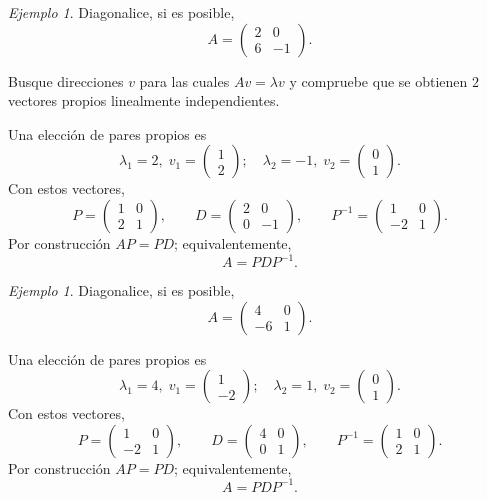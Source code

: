\documentclass[12pt]{article}
\theoremstyle{remark}
\newtheorem{Ejem}[definicion]{Ejemplo}
\begin{document}
\begin{Ejem}

Diagonalice, si es posible,
\[
A=\begin{pmatrix}2 & 0\\6 & -1\end{pmatrix}.
\]


Busque direcciones $v$ para las cuales $Av=\lambda v$ y compruebe que se obtienen $2$ vectores propios linealmente independientes.

\scriptsize
Una elección de pares propios es
\[
\lambda_1=2,\;v_1=\begin{pmatrix}1\\2\end{pmatrix};\quad \lambda_2=-1,\;v_2=\begin{pmatrix}0\\1\end{pmatrix}.
\]
Con estos vectores,
\[
P=\begin{pmatrix}1 & 0\\2 & 1\end{pmatrix},\qquad D=\begin{pmatrix}2 & 0\\0 & -1\end{pmatrix},\qquad P^{-1}=\begin{pmatrix}1 & 0\\-2 & 1\end{pmatrix}.
\]
Por construcción $AP=PD$; equivalentemente,
\[
\boxed{A=PDP^{-1}}.
\]

\end{Ejem}

\begin{Ejem}


Diagonalice, si es posible,
\[
A=\begin{pmatrix}4 & 0\\-6 & 1\end{pmatrix}.
\]

\scriptsize
Una elección de pares propios es
\[
\lambda_1=4,\;v_1=\begin{pmatrix}1\\-2\end{pmatrix};\quad \lambda_2=1,\;v_2=\begin{pmatrix}0\\1\end{pmatrix}.
\]
Con estos vectores,
\[
P=\begin{pmatrix}1 & 0\\-2 & 1\end{pmatrix},\qquad D=\begin{pmatrix}4 & 0\\0 & 1\end{pmatrix},\qquad P^{-1}=\begin{pmatrix}1 & 0\\2 & 1\end{pmatrix}.
\]
Por construcción $AP=PD$; equivalentemente,
\[
\boxed{A=PDP^{-1}}.
\]
\end{Ejem}
\end{document}
